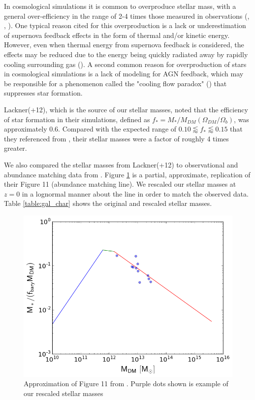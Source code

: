 \documentclass[english, apj]{emulateapj}
\begin{document}
In cosmological simulations it is common to overproduce stellar mass, with a general over-efficiency in the range of 2-4 times those measured in observations (\citet{1996ApJS..105...19K}, \citet{2010MNRAS.404.1111G}, \citet{2010ApJ...725.2312O}).  One typical reason cited for this overproduction is a lack or underestimation of supernova feedback effects in the form of thermal and/or kinetic energy.  However, even when thermal energy from supernova feedback is considered, the effects may be reduced due to the energy being quickly radiated away by rapidly cooling surrounding gas (\citet{1996ApJS..105...19K}).  A second common reason for overproduction of stars in cosmological simulations is a lack of modeling for AGN feedback, which may be responsible for a phenomenon called the "cooling flow paradox" (\citet{2001MNRAS.321L..20F}) that suppresses star formation. 

Lackner(+12), which is the source of our stellar masses, noted that the efficiency of star formation in their simulations, defined as $f_*=M_*/M_{DM}(\Omega_{DM}/\Omega_b)$, was approximately 0.6.  Compared with the expected range of $0.10 \lessapprox f_* \lessapprox 0.15$ that they referenced from \citet{2012ApJ...746...95L}, their stellar masses were a factor of roughly 4 times greater.

We also compared the stellar masses from Lackner\-(+12) to  observational and abundance matching data from \citet{2018AstL...44....8K}. Figure \ref{fig:stellar1} is a partial, approximate, replication of their Figure 11 (abundance matching line).  We rescaled our stellar masses at $z=0$ in a lognormal manner about the line in order to match the observed data.  Table \ref{table:gal_char} shows the original and rescaled stellar masses.

\begin{figure}[htbp]
\begin{center}
\includegraphics[width=1.0\columnwidth]{plots/stellar_to_halo_ratio.png}
\caption{Approximation of Figure 11 from \citet{2018AstL...44....8K}.  Purple dots shown is example of our rescaled stellar masses}
\label{fig:stellar1}
\end{center}
\end{figure}
\end{document}
